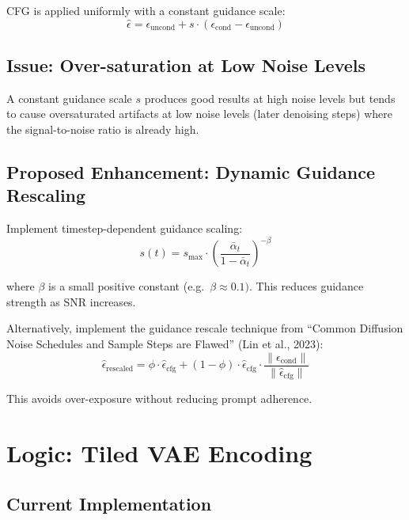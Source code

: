 \documentclass[11pt,a4paper]{article}
\begin{document}
CFG is applied uniformly with a constant guidance scale:
\begin{equation}
    \hat{\epsilon} = \epsilon_{\text{uncond}} + s \cdot (\epsilon_{\text{cond}} - \epsilon_{\text{uncond}})
\end{equation}

\subsection{Issue: Over-saturation at Low Noise Levels}

A constant guidance scale $s$ produces good results at high noise levels but tends to cause oversaturated artifacts at low noise levels (later denoising steps) where the signal-to-noise ratio is already high.

\subsection{Proposed Enhancement: Dynamic Guidance Rescaling}

Implement timestep-dependent guidance scaling:
\begin{equation}
    s(t) = s_{\max} \cdot \left(\frac{\bar{\alpha}_t}{1 - \bar{\alpha}_t}\right)^{-\beta}
\end{equation}

where $\beta$ is a small positive constant (e.g.\ $\beta \approx 0.1)$.
This reduces guidance strength as SNR increases.

Alternatively, implement the guidance rescale technique from ``Common Diffusion Noise Schedules and Sample Steps are Flawed'' (Lin et al., 2023):
\begin{equation}
    \hat{\epsilon}_{\text{rescaled}} = \phi \cdot \hat{\epsilon}_{\text{cfg}} + (1-\phi) \cdot \hat{\epsilon}_{\text{cfg}} \cdot \frac{\|\epsilon_{\text{cond}}\|}{\|\hat{\epsilon}_{\text{cfg}}\|}
\end{equation}

This avoids over-exposure without reducing prompt adherence.

\section{Logic: Tiled VAE Encoding}

\subsection{Current Implementation}
\end{document}

